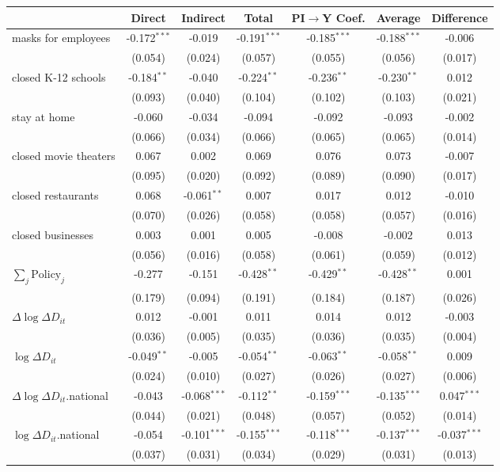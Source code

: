 
\begin{tabular}{lccccc|>{}c}
\toprule
  & Direct & Indirect & Total & PI$\to$Y Coef. & Average & Difference\\
\midrule
masks for employees & -0.172$^{***}$ & -0.019 & -0.191$^{***}$ & -0.185$^{***}$ & -0.188$^{***}$ & -0.006\\
 & (0.054) & (0.024) & (0.057) & (0.055) & (0.056) & (0.017)\\
closed K-12 schools & -0.184$^{**}$ & -0.040 & -0.224$^{**}$ & -0.236$^{**}$ & -0.230$^{**}$ & 0.012\\
 & (0.093) & (0.040) & (0.104) & (0.102) & (0.103) & (0.021)\\
stay at home & -0.060 & -0.034 & -0.094 & -0.092 & -0.093 & -0.002\\
 & (0.066) & (0.034) & (0.066) & (0.065) & (0.065) & (0.014)\\
closed movie theaters & 0.067 & 0.002 & 0.069 & 0.076 & 0.073 & -0.007\\
 & (0.095) & (0.020) & (0.092) & (0.089) & (0.090) & (0.017)\\
closed restaurants & 0.068 & -0.061$^{**}$ & 0.007 & 0.017 & 0.012 & -0.010\\
 & (0.070) & (0.026) & (0.058) & (0.058) & (0.057) & (0.016)\\
closed businesses & 0.003 & 0.001 & 0.005 & -0.008 & -0.002 & 0.013\\
 & (0.056) & (0.016) & (0.058) & (0.061) & (0.059) & (0.012)\\
$\sum_j \mathrm{Policy}_j$ & -0.277 & -0.151 & -0.428$^{**}$ & -0.429$^{**}$ & -0.428$^{**}$ & 0.001\\
 & (0.179) & (0.094) & (0.191) & (0.184) & (0.187) & (0.026)\\
$\Delta \log \Delta D_{it}$ & 0.012 & -0.001 & 0.011 & 0.014 & 0.012 & -0.003\\
 & (0.036) & (0.005) & (0.035) & (0.036) & (0.035) & (0.004)\\
$\log \Delta D_{it}$ & -0.049$^{**}$ & -0.005 & -0.054$^{**}$ & -0.063$^{**}$ & -0.058$^{**}$ & 0.009\\
 & (0.024) & (0.010) & (0.027) & (0.026) & (0.027) & (0.006)\\
$\Delta \log \Delta D_{it}$.national & -0.043 & -0.068$^{***}$ & -0.112$^{**}$ & -0.159$^{***}$ & -0.135$^{***}$ & 0.047$^{***}$\\
 & (0.044) & (0.021) & (0.048) & (0.057) & (0.052) & (0.014)\\
$\log \Delta D_{it}$.national & -0.054 & -0.101$^{***}$ & -0.155$^{***}$ & -0.118$^{***}$ & -0.137$^{***}$ & -0.037$^{***}$\\
 & (0.037) & (0.031) & (0.034) & (0.029) & (0.031) & (0.013)\\
\bottomrule
\end{tabular}